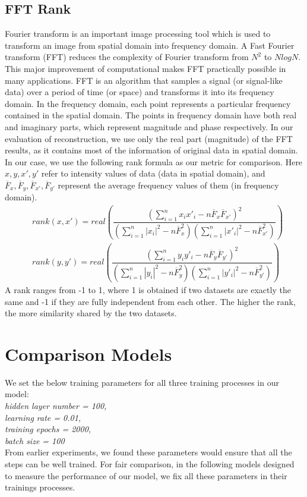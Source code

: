 \documentclass[12pt]{report} %
\begin{document}
\subsection{FFT Rank}
Fourier transform\cite{FT} is an important image processing tool which is used to transform an image from spatial domain into frequency domain. A Fast Fourier transform (FFT)\cite{FFT} reduces the complexity of Fourier transform from $N^2$ to $NlogN$. This major improvement of computational makes FFT practically possible in many applications. FFT is an algorithm that samples a signal (or signal-like data) over a period of time (or space) and transforms it into its frequency domain. In the frequency domain, each point represents a particular frequency contained in the spatial domain. The points in frequency domain have both real and imaginary parts, which represent magnitude and phase respectively. In our evaluation of reconstruction, we use only the real part (magnitude) of the FFT results, as it contains most of the information of original data in spatial domain. \\
In our case, we use the following rank formula as our metric for comparison. Here $x,y,x',y'$ refer to intensity values of data (data in spatial domain), and $\overline F_x,\overline F_y,\overline F_{x'},\overline F_{y'}$ represent the average frequency values of them (in frequency domain)\cite{ISA}.
\begin{equation}
\begin{split}
&rank(x,x')=real(\dfrac{(\sum_{i=1}^{n} x_{i}x'_{i}-n\overline F_{x} \overline F_{x'})^2}{(\sum_{i=1}^{n} |x_i|^2-n\overline F_{x}^2)(\sum_{i=1}^{n} |x'_i|^2-n\overline F_{x'}^2)}) \\
&rank(y,y')=real(\dfrac{(\sum_{i=1}^{n} y_{i}y'_{i}-n\overline F_{y} \overline F_{y'})^2}{(\sum_{i=1}^{n} |y_i|^2-n\overline F_{y}^2)(\sum_{i=1}^{n} |y'_i|^2-n\overline F_{y'}^2)})
\end{split}
\end{equation}
A rank ranges from -1 to 1, where 1 is obtained if two datasets are exactly the same and -1 if they are fully independent from each other. The higher the rank, the more similarity shared by the two datasets.

\section{Comparison Models}
We set the below training parameters for all three training processes in our model:\\
\textit{hidden layer number = 100, \\
	learning rate = 0.01, \\
	training epochs = 2000, \\
	batch size = 100}\\
From earlier experiments, we found these parameters would ensure that all the steps can be well trained. For fair comparison, in the following models designed to measure the performance of our model, we fix all these parameters in their trainings processes.
\end{document}
